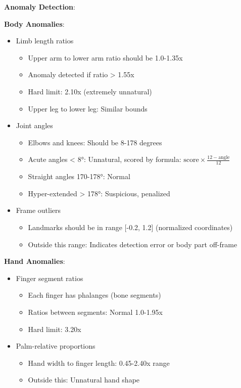 \documentclass[12pt,a4paper]{book}
\begin{document}
\textbf{Anomaly Detection}:

\textbf{Body Anomalies}:

\begin{itemize}
    \item Limb length ratios
    \begin{itemize}
        \item Upper arm to lower arm ratio should be 1.0-1.35x
        \item Anomaly detected if ratio > 1.55x
        \item Hard limit: 2.10x (extremely unnatural)
        \item Upper leg to lower leg: Similar bounds
    \end{itemize}
    
    \item Joint angles
    \begin{itemize}
        \item Elbows and knees: Should be 8-178 degrees
        \item Acute angles < 8°: Unnatural, scored by formula: $\text{score} \times \frac{12 - \text{angle}}{12}$
        \item Straight angles 170-178°: Normal
        \item Hyper-extended > 178°: Suspicious, penalized
    \end{itemize}
    
    \item Frame outliers
    \begin{itemize}
        \item Landmarks should be in range [-0.2, 1.2] (normalized coordinates)
        \item Outside this range: Indicates detection error or body part off-frame
    \end{itemize}
\end{itemize}

\textbf{Hand Anomalies}:

\begin{itemize}
    \item Finger segment ratios
    \begin{itemize}
        \item Each finger has phalanges (bone segments)
        \item Ratios between segments: Normal 1.0-1.95x
        \item Hard limit: 3.20x
    \end{itemize}
    
    \item Palm-relative proportions
    \begin{itemize}
        \item Hand width to finger length: 0.45-2.40x range
        \item Outside this: Unnatural hand shape
    \end{itemize}
\end{itemize}
\end{document}
